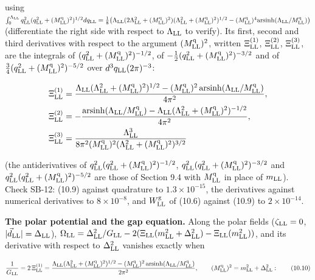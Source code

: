 \documentclass[
  10pt,
]{article}
\begin{document}
using
\(\int_0^{\Lambda_{\rm LL}}q_{\rm LL}^2(q_{\rm LL}^2+(M^{\rm q}_{\rm LL})^2)^{1/2}dq_{\rm LL}=\tfrac18\big(\Lambda_{\rm LL}(2\Lambda_{\rm LL}^2+(M^{\rm q}_{\rm LL})^2)(\Lambda_{\rm LL}^2+(M^{\rm q}_{\rm LL})^2)^{1/2}-(M^{\rm q}_{\rm LL})^4\mathrm{arsinh}(\Lambda_{\rm LL}/M^{\rm q}_{\rm LL})\big)\)
(differentiate the right side with respect to \(\Lambda_{\rm LL}\) to
verify). Its first, second and third derivatives with respect to the
argument \((M^{\rm q}_{\rm LL})^2\), written \(\Xi^{(1)}_{\rm LL}\),
\(\Xi^{(2)}_{\rm LL}\), \(\Xi^{(3)}_{\rm LL}\), are the integrals of
\((q_{\rm LL}^2+(M^{\rm q}_{\rm LL})^2)^{-1/2}\), of
\(-\tfrac12(q_{\rm LL}^2+(M^{\rm q}_{\rm LL})^2)^{-3/2}\) and of
\(\tfrac34(q_{\rm LL}^2+(M^{\rm q}_{\rm LL})^2)^{-5/2}\) over
\(d^3q_{\rm LL}(2\pi)^{-3}\):

\[\begin{aligned}\Xi^{(1)}_{\rm LL}&=\frac{\Lambda_{\rm LL}(\Lambda_{\rm LL}^2+(M^{\rm q}_{\rm LL})^2)^{1/2}-(M^{\rm q}_{\rm LL})^2\,\mathrm{arsinh}(\Lambda_{\rm LL}/M^{\rm q}_{\rm LL})}{4\pi^2},\\\Xi^{(2)}_{\rm LL}&=-\frac{\mathrm{arsinh}(\Lambda_{\rm LL}/M^{\rm q}_{\rm LL})-\Lambda_{\rm LL}(\Lambda_{\rm LL}^2+(M^{\rm q}_{\rm LL})^2)^{-1/2}}{4\pi^2},\\\Xi^{(3)}_{\rm LL}&=\frac{\Lambda_{\rm LL}^3}{8\pi^2(M^{\rm q}_{\rm LL})^2(\Lambda_{\rm LL}^2+(M^{\rm q}_{\rm LL})^2)^{3/2}}\end{aligned}\]

(the antiderivatives of
\(q_{\rm LL}^2(q_{\rm LL}^2+(M^{\rm q}_{\rm LL})^2)^{-1/2}\),
\(q_{\rm LL}^2(q_{\rm LL}^2+(M^{\rm q}_{\rm LL})^2)^{-3/2}\) and
\(q_{\rm LL}^2(q_{\rm LL}^2+(M^{\rm q}_{\rm LL})^2)^{-5/2}\) are those
of Section 9.4 with \(M^{\rm q}_{\rm LL}\) in place of \(m_{\rm LL}\)).
Check SB-12: (10.9) against quadrature to \(1.3\times10^{-15}\), the
derivatives against numerical derivatives to \(8\times10^{-8}\), and
\(W^{\rm g}_{\rm LL}\) of (10.6) against (10.9) to \(2\times10^{-14}\).

\textbf{The polar potential and the gap equation.} Along the polar
fields (\(\zeta_{\rm LL}=0\),
\(\lvert\vec d_{\rm LL}\rvert=\Delta_{\rm LL}\)),
\(\Omega_{\rm LL}=\Delta_{\rm LL}^2/G_{\rm LL}-2(\Xi_{\rm LL}(m_{\rm LL}^2+\Delta_{\rm LL}^2)-\Xi_{\rm LL}(m_{\rm LL}^2))\),
and its derivative with respect to \(\Delta_{\rm LL}^2\) vanishes
exactly when

\[\frac1{G_{\rm LL}}=2\,\Xi^{(1)}_{\rm LL}=\frac{\Lambda_{\rm LL}(\Lambda_{\rm LL}^2+(M^{\rm q}_{\rm LL})^2)^{1/2}-(M^{\rm q}_{\rm LL})^2\,\mathrm{arsinh}(\Lambda_{\rm LL}/M^{\rm q}_{\rm LL})}{2\pi^2},\qquad(M^{\rm q}_{\rm LL})^2=m_{\rm LL}^2+\Delta_{\rm LL}^2:\tag{10.10}\]
\end{document}
